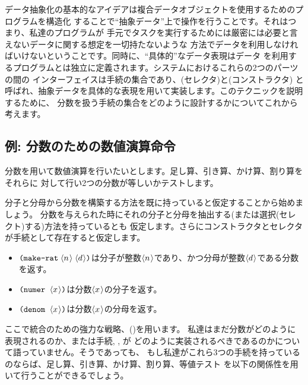 データ抽象化の基本的なアイデアは複合データオブジェクトを使用するためのプログラムを構造化
することで``抽象データ''上で操作を行うことです。それはつまり、私達のプログラムが
手元でタスクを実行するためには厳密には必要と言えないデータに関する想定を一切持たないような
方法でデータを利用しなければいけないということです。同時に、``具体的''なデータ表現はデータ
を利用するプログラムとは独立に定義されます。システムにおけるこれらの2つのパーツの間の
インターフェイスは手続の集合であり、(セレクタ)と(コンストラクタ)
と呼ばれ、抽象データを具体的な表現を用いて実装します。このテクニックを説明するために、
分数を扱う手続の集合をどのように設計するかについてこれから考えます。



\subsection{例: 分数のための数値演算命令}
\label{Section 2.1.1}



分数を用いて数値演算を行いたいとします。足し算、引き算、かけ算、割り算をそれらに
対して行い2つの分数が等しいかテストします。



分子と分母から分数を構築する方法を既に持っていると仮定することから始めましょう。
分数を与えられた時にそれの分子と分母を抽出する(または選択(セレクト)する)方法を持っているとも
仮定します。さらにコンストラクタとセレクタが手続として存在すると仮定します。

\begin{itemize}

\item
\( \hbox{\tt(make-rat}\;\langle{n}\kern0.08em\rangle\;\langle{d}\kern0.06em\rangle\hbox{\tt)} \)は分子が整数\( \langle{n}\kern0.08em\rangle \)であり、かつ分母が整数\( \langle{d}\kern0.06em\rangle \)である分数を返す。

\item
\( \hbox{\tt(numer}\;\;\langle{x}\kern0.08em\rangle\hbox{\tt)} \)は分数\( \langle{x}\kern0.08em\rangle \)の分子を返す。

\item
\( \hbox{\tt(denom}\;\;\langle{x}\kern0.08em\rangle\hbox{\tt)} \)は分数\( \langle{x}\kern0.08em\rangle \)の分母を返す。

\end{itemize}

\noindent
ここで統合のための強力な戦略、()を用います。
私達はまだ分数がどのように表現されるのか、または手続, , が
どのように実装されるべきであるのかについて語っていません。そうであっても、
もし私達がこれら3つの手続を持っているのならば、足し算、引き算、かけ算、割り算、等値テスト
を以下の関係性を用いて行うことができるでしょう。

